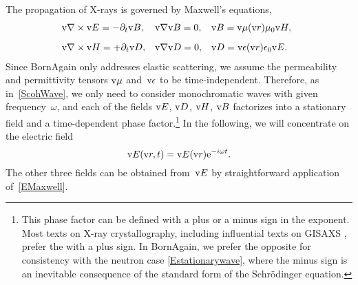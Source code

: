 The propagation of X-rays is governed by Maxwell's equations,
%
\begin{equation}\label{EMaxwell}
  \begin{array}{@{}l@{\quad}l@{\quad}l}
    \Nabla\times\v{E}=-\partial_t \v{B},
   &\Nabla\v{B}=0,
   &\v{B}=\v{\mu}(\r)\mu_0\v{H},
   \\[2ex]
    \Nabla\times\v{H}=+\partial_t \v{D},
   &\Nabla\v{D}=0,
   &\v{D}=\v{\eps}(\r)\eps_0\v{E}.
  \end{array}
\end{equation}
%
%
%
%
%
%
Since BornAgain only addresses elastic scattering,
%
%
we assume the permeability and permittivity tensors $\text{v}\mu$ and~$\text{v}\epsilon$
to be time-independent.
%
Therefore, as in~\cref{ScohWave}, we only need to consider monochromatic waves
%
%
with given frequency~$\omega$,
and each of the fields $\text{v}{E}$, $\text{v}{D}$, $\text{v}{H}$, $\text{v}{B}$
factorizes into a stationary field and a time-dependent phase factor.\footnote
{This phase factor can be defined with a plus or a minus sign in the exponent.
Most texts on X-ray crystallography,
including influential texts on GISAXS \cite{ReLL09},
prefer the  with a plus sign.
%
%
%
%
In BornAgain, we prefer the opposite 
%
for consistency with the neutron case \cref{Estationarywave},
where the minus sign is an inevitable consequence
of the standard form of the Schrödinger equation.%
%
}
%
In the following, we will concentrate on the electric field
%
\begin{equation}\label{EstationaryX}
  \text{v}{E}(\text{v}{r},t) = \text{v}{E}(\text{v}{r})\mathrm e^{-i\omega t}.
\end{equation}
The other three fields can be obtained from~$\text{v}{E}$
by straightforward application of~\cref{EMaxwell}.

